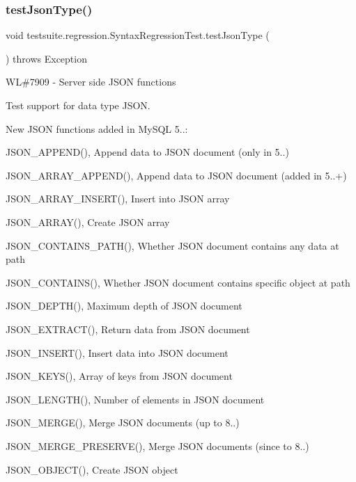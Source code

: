 \subsubsection{\texorpdfstring{test\+Json\+Type()}{testJsonType()}}
{\footnotesize\ttfamily void testsuite.\+regression.\+Syntax\+Regression\+Test.\+test\+Json\+Type (\begin{DoxyParamCaption}{ }\end{DoxyParamCaption}) throws Exception}

WL\#7909 -\/ Server side J\+S\+ON functions

Test support for data type J\+S\+ON.

New J\+S\+ON functions added in My\+S\+QL 5..\+:
\begin{DoxyItemize}
\item J\+S\+O\+N\+\_\+\+A\+P\+P\+E\+N\+D(), Append data to J\+S\+ON document (only in 5..)
\item J\+S\+O\+N\+\_\+\+A\+R\+R\+A\+Y\+\_\+\+A\+P\+P\+E\+N\+D(), Append data to J\+S\+ON document (added in 5..+)
\item J\+S\+O\+N\+\_\+\+A\+R\+R\+A\+Y\+\_\+\+I\+N\+S\+E\+R\+T(), Insert into J\+S\+ON array
\item J\+S\+O\+N\+\_\+\+A\+R\+R\+A\+Y(), Create J\+S\+ON array
\item J\+S\+O\+N\+\_\+\+C\+O\+N\+T\+A\+I\+N\+S\+\_\+\+P\+A\+T\+H(), Whether J\+S\+ON document contains any data at path
\item J\+S\+O\+N\+\_\+\+C\+O\+N\+T\+A\+I\+N\+S(), Whether J\+S\+ON document contains specific object at path
\item J\+S\+O\+N\+\_\+\+D\+E\+P\+T\+H(), Maximum depth of J\+S\+ON document
\item J\+S\+O\+N\+\_\+\+E\+X\+T\+R\+A\+C\+T(), Return data from J\+S\+ON document
\item J\+S\+O\+N\+\_\+\+I\+N\+S\+E\+R\+T(), Insert data into J\+S\+ON document
\item J\+S\+O\+N\+\_\+\+K\+E\+Y\+S(), Array of keys from J\+S\+ON document
\item J\+S\+O\+N\+\_\+\+L\+E\+N\+G\+T\+H(), Number of elements in J\+S\+ON document
\item J\+S\+O\+N\+\_\+\+M\+E\+R\+G\+E(), Merge J\+S\+ON documents (up to 8..)
\item J\+S\+O\+N\+\_\+\+M\+E\+R\+G\+E\+\_\+\+P\+R\+E\+S\+E\+R\+V\+E(), Merge J\+S\+ON documents (since to 8..)
\item J\+S\+O\+N\+\_\+\+O\+B\+J\+E\+C\+T(), Create J\+S\+ON object

\end{DoxyItemize}
